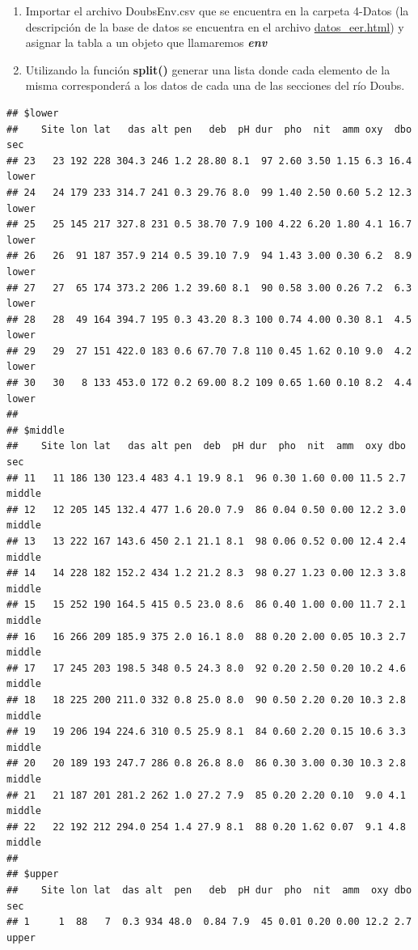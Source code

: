 \documentclass[]{book}
\begin{document}
\begin{enumerate}
\def\labelenumi{\arabic{enumi}.}
\item
  Importar el archivo DoubsEnv.csv que se encuentra en la carpeta 4-Datos (la descripción de la base de datos se encuentra en el archivo \href{/datos_eer.html}{datos\_eer.html}) y asignar la tabla a un objeto que llamaremos \textbf{\emph{env}}
\item
  Utilizando la función \textbf{split()} generar una lista donde cada elemento de la misma corresponderá a los datos de cada una de las secciones del río Doubs.
\end{enumerate}

\begin{verbatim}
## $lower
##    Site lon lat   das alt pen   deb  pH dur  pho  nit  amm oxy  dbo   sec
## 23   23 192 228 304.3 246 1.2 28.80 8.1  97 2.60 3.50 1.15 6.3 16.4 lower
## 24   24 179 233 314.7 241 0.3 29.76 8.0  99 1.40 2.50 0.60 5.2 12.3 lower
## 25   25 145 217 327.8 231 0.5 38.70 7.9 100 4.22 6.20 1.80 4.1 16.7 lower
## 26   26  91 187 357.9 214 0.5 39.10 7.9  94 1.43 3.00 0.30 6.2  8.9 lower
## 27   27  65 174 373.2 206 1.2 39.60 8.1  90 0.58 3.00 0.26 7.2  6.3 lower
## 28   28  49 164 394.7 195 0.3 43.20 8.3 100 0.74 4.00 0.30 8.1  4.5 lower
## 29   29  27 151 422.0 183 0.6 67.70 7.8 110 0.45 1.62 0.10 9.0  4.2 lower
## 30   30   8 133 453.0 172 0.2 69.00 8.2 109 0.65 1.60 0.10 8.2  4.4 lower
## 
## $middle
##    Site lon lat   das alt pen  deb  pH dur  pho  nit  amm  oxy dbo    sec
## 11   11 186 130 123.4 483 4.1 19.9 8.1  96 0.30 1.60 0.00 11.5 2.7 middle
## 12   12 205 145 132.4 477 1.6 20.0 7.9  86 0.04 0.50 0.00 12.2 3.0 middle
## 13   13 222 167 143.6 450 2.1 21.1 8.1  98 0.06 0.52 0.00 12.4 2.4 middle
## 14   14 228 182 152.2 434 1.2 21.2 8.3  98 0.27 1.23 0.00 12.3 3.8 middle
## 15   15 252 190 164.5 415 0.5 23.0 8.6  86 0.40 1.00 0.00 11.7 2.1 middle
## 16   16 266 209 185.9 375 2.0 16.1 8.0  88 0.20 2.00 0.05 10.3 2.7 middle
## 17   17 245 203 198.5 348 0.5 24.3 8.0  92 0.20 2.50 0.20 10.2 4.6 middle
## 18   18 225 200 211.0 332 0.8 25.0 8.0  90 0.50 2.20 0.20 10.3 2.8 middle
## 19   19 206 194 224.6 310 0.5 25.9 8.1  84 0.60 2.20 0.15 10.6 3.3 middle
## 20   20 189 193 247.7 286 0.8 26.8 8.0  86 0.30 3.00 0.30 10.3 2.8 middle
## 21   21 187 201 281.2 262 1.0 27.2 7.9  85 0.20 2.20 0.10  9.0 4.1 middle
## 22   22 192 212 294.0 254 1.4 27.9 8.1  88 0.20 1.62 0.07  9.1 4.8 middle
## 
## $upper
##    Site lon lat  das alt  pen   deb  pH dur  pho  nit  amm  oxy dbo   sec
## 1     1  88   7  0.3 934 48.0  0.84 7.9  45 0.01 0.20 0.00 12.2 2.7 upper

\end{verbatim}
\end{document}
